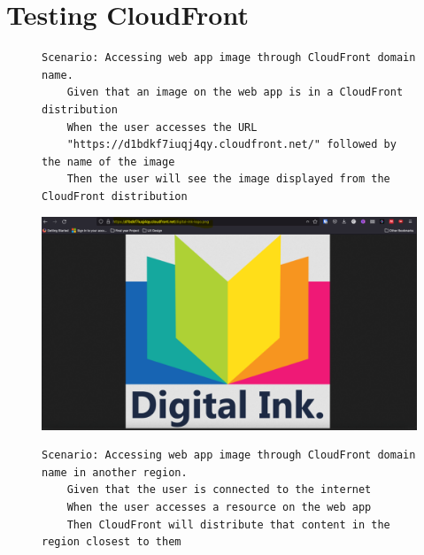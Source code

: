 \section{Testing CloudFront}\label{sec:testing-cloudfront}
\begin{figure}[!htbp]
    \centering
    \begin{verbatim}
Scenario: Accessing web app image through CloudFront domain name.
    Given that an image on the web app is in a CloudFront distribution
    When the user accesses the URL
    "https://d1bdkf7iuqj4qy.cloudfront.net/" followed by the name of the image
    Then the user will see the image displayed from the CloudFront distribution
    \end{verbatim}
    \label{fig:accessing-image-cloudfront}
\end{figure}

\begin{figure}[!htbp]
    \centering
    \includegraphics[width=125mm]{resources/cloudfront/cloudfront-website}
    \label{fig:cloudfront-test-photo}
\end{figure}

\clearpage
\begin{figure}[!htbp]
    \centering
    \begin{verbatim}
Scenario: Accessing web app image through CloudFront domain name in another region.
    Given that the user is connected to the internet
    When the user accesses a resource on the web app
    Then CloudFront will distribute that content in the region closest to them
    \end{verbatim}
    \label{fig:accessing-image-cloudfront-diff-region}
\end{figure}

